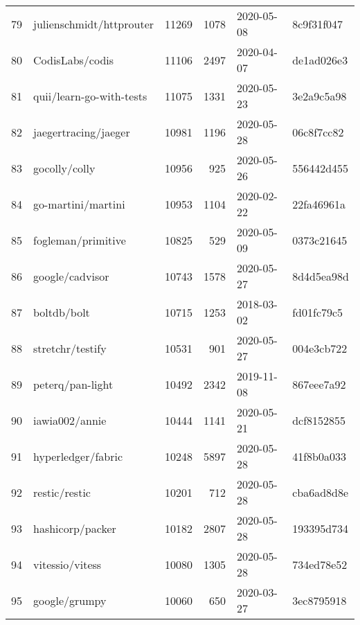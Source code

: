 \begin{footnotesize}
\begin{longtable}{llrrll}
        79  &                           julienschmidt/httprouter &  11269 &   1078 & 2020-05-08 &  8c9f31f047 \\
        80  &                                    CodisLabs/codis &  11106 &   2497 & 2020-04-07 &  de1ad026e3 \\
        81  &                           quii/learn-go-with-tests &  11075 &   1331 & 2020-05-23 &  3e2a9c5a98 \\
        82  &                               jaegertracing/jaeger &  10981 &   1196 & 2020-05-28 &  06c8f7cc82 \\
        83  &                                      gocolly/colly &  10956 &    925 & 2020-05-26 &  556442d455 \\
        84  &                                 go-martini/martini &  10953 &   1104 & 2020-02-22 &  22fa46961a \\
        85  &                                 fogleman/primitive &  10825 &    529 & 2020-05-09 &  0373c21645 \\
        86  &                                    google/cadvisor &  10743 &   1578 & 2020-05-27 &  8d4d5ea98d \\
        87  &                                        boltdb/bolt &  10715 &   1253 & 2018-03-02 &  fd01fc79c5 \\
        88  &                                   stretchr/testify &  10531 &    901 & 2020-05-27 &  004e3cb722 \\
        89  &                                   peterq/pan-light &  10492 &   2342 & 2019-11-08 &  867eee7a92 \\
        90  &                                     iawia002/annie &  10444 &   1141 & 2020-05-21 &  dcf8152855 \\
        91  &                                 hyperledger/fabric &  10248 &   5897 & 2020-05-28 &  41f8b0a033 \\
        92  &                                      restic/restic &  10201 &    712 & 2020-05-28 &  cba6ad8d8e \\
        93  &                                   hashicorp/packer &  10182 &   2807 & 2020-05-28 &  193395d734 \\
        94  &                                    vitessio/vitess &  10080 &   1305 & 2020-05-28 &  734ed78e52 \\
        95  &                                      google/grumpy &  10060 &    650 & 2020-03-27 &  3ec8795918 \\

\end{longtable}
\end{footnotesize}

